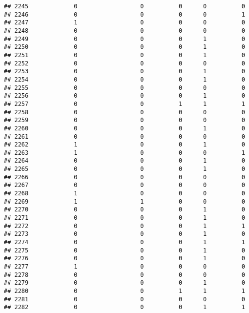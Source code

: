\documentclass[
]{article}
\begin{document}
\begin{verbatim}
## 2245             0                  0          0      0          0
## 2246             0                  0          0      0          1
## 2247             1                  0          0      0          0
## 2248             0                  0          0      0          0
## 2249             0                  0          0      1          0
## 2250             0                  0          0      1          0
## 2251             0                  0          0      1          0
## 2252             0                  0          0      0          0
## 2253             0                  0          0      1          0
## 2254             0                  0          0      1          0
## 2255             0                  0          0      0          0
## 2256             0                  0          0      1          0
## 2257             0                  0          1      1          1
## 2258             0                  0          0      0          0
## 2259             0                  0          0      0          0
## 2260             0                  0          0      1          0
## 2261             0                  0          0      0          0
## 2262             1                  0          0      1          0
## 2263             1                  0          0      0          1
## 2264             0                  0          0      1          0
## 2265             0                  0          0      1          0
## 2266             0                  0          0      0          0
## 2267             0                  0          0      0          0
## 2268             1                  0          0      0          0
## 2269             1                  1          0      0          0
## 2270             0                  0          0      1          0
## 2271             0                  0          0      1          0
## 2272             0                  0          0      1          1
## 2273             0                  0          0      1          0
## 2274             0                  0          0      1          1
## 2275             0                  0          0      1          0
## 2276             0                  0          0      1          0
## 2277             1                  0          0      0          0
## 2278             0                  0          0      0          0
## 2279             0                  0          0      1          0
## 2280             0                  0          1      1          1
## 2281             0                  0          0      0          0
## 2282             0                  0          0      1          1

\end{verbatim}
\end{document}
